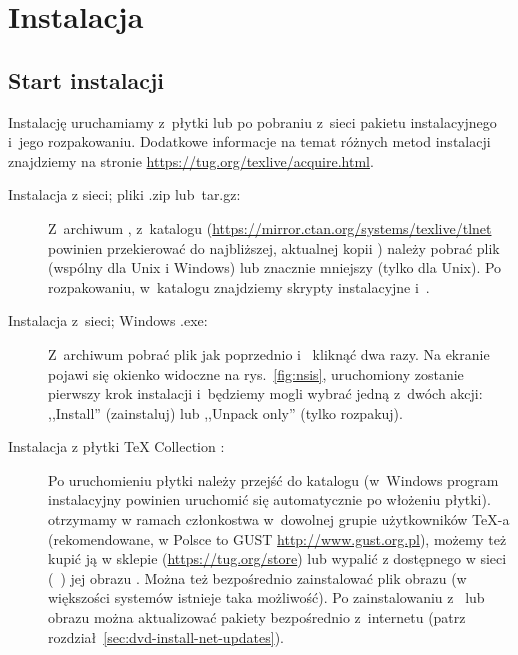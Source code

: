 \documentclass{article}
\begin{document}
\section{Instalacja}
\label{sec:install}

\subsection{Start instalacji}
\label{sec:inst-start}

Instalację \TL{} uruchamiamy z~płytki \TK{} \DVD{} lub po pobraniu z~sieci
pakietu instalacyjnego i~jego rozpakowaniu.
Dodatkowe informacje na temat różnych metod instalacji znajdziemy
na stronie \url{https://tug.org/texlive/acquire.html}.

\begin{description}
\item [Instalacja z sieci; pliki .zip lub~tar.gz:] Z~archiwum \CTAN, z~katalogu
(\url{https://mirror.ctan.org/systems/texlive/tlnet} powinien
przekierować do najbliższej, aktualnej kopii \CTAN) należy pobrać plik
 (wspólny dla Unix i Windows) lub znacznie mniejszy
 (tylko dla Unix). Po rozpakowaniu,
w~katalogu  znajdziemy skrypty instalacyjne
 i~.

\item [Instalacja z~sieci; Windows .exe:]
Z~archiwum \CTAN   pobrać plik jak poprzednio i~ kliknąć dwa razy. Na ekranie pojawi się okienko  widoczne na rys.~\ref{fig:nsis},  uruchomiony zostanie pierwszy krok instalacji  i~będziemy mogli wybrać jedną z~dwóch akcji: ,,Install'' (zainstaluj) lub ,,Unpack only'' (tylko rozpakuj).


\item [Instalacja z płytki \TeX{} Collection \DVD:] Po uruchomieniu
płytki należy przejść do katalogu    \DVD{}
(w~Windows program instalacyjny powinien uruchomić się  automatycznie po włożeniu płytki).
\DVD{} otrzymamy w ramach członkostwa w~dowolnej grupie użytkowników
  \TeX-a (rekomendowane, w Polsce to GUST  \url{http://www.gust.org.pl}), możemy też kupić ją  w sklepie (\url{https://tug.org/store})
 lub  wypalić  z dostępnego w sieci (\CTAN\ ) jej obrazu \ISO{}. Można też 
bezpośrednio zainstalować plik obrazu (w większości systemów istnieje taka możliwość). Po
zainstalowaniu z \DVD\ lub obrazu \ISO{} można aktualizować pakiety
bezpośrednio z~internetu (patrz rozdział~\ref{sec:dvd-install-net-updates}).
\end{description}
\end{document}

